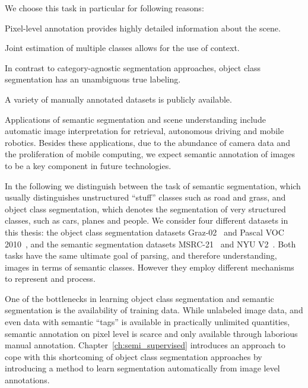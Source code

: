 We choose this task in particular for following reasons:
\begin{itemize*}
    \item Pixel-level annotation provides highly detailed information about the scene.
    \item Joint estimation of multiple classes allows for the use of context.
    \item In contrast to category-agnostic segmentation approaches, object class segmentation
        has an unambiguous true labeling.
    \item A variety of manually annotated datasets is publicly available.
\end{itemize*}
%
Applications of semantic segmentation and scene understanding include automatic
image interpretation for retrieval, autonomous driving and mobile robotics.
Besides these applications, due to the abundance of camera data and the
proliferation of mobile computing, we expect semantic annotation of images to
be a key component in future technologies.

In the following we distinguish between the task of semantic segmentation,
which usually distinguishes unstructured ``stuff'' classes such as road and
grass, and object class segmentation, which denotes the segmentation of very
structured classes, such as cars, planes and people. We consider four
different datasets in this thesis: the object class segmentation datasets
Graz-02~\citep{marszatek2007accurate} and Pascal VOC 2010~\citep{pascal}, and the semantic segmentation datasets
MSRC-21~\citep{shotton2006textonboost} and NYU V2~\citep{SilbermanECCV12}.
%
Both tasks have the same ultimate goal of parsing, and therefore understanding,
images in terms of semantic classes. However they employ different mechanisms
to represent and process.

One of the bottlenecks in learning object class segmentation and semantic
segmentation is the availability of training data.  While unlabeled image data,
and even data with semantic
``tags'' is available in practically unlimited quantities, semantic annotation
on pixel level is scarce and only available through laborious manual annotation. 
Chapter~\ref{ch:semi_supervised} introduces an approach to cope with this
shortcoming of object class segmentation approaches by introducing a method to
learn segmentation automatically from image level annotations.

